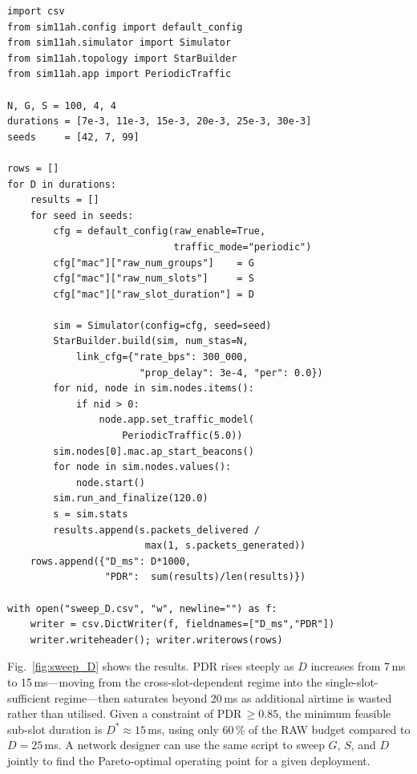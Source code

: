 \documentclass[conference]{IEEEtran}
\begin{document}
\begin{lstlisting}[style=python, caption={RAW sub-slot duration sweep.},
                   label={lst:sweep}]
import csv
from sim11ah.config import default_config
from sim11ah.simulator import Simulator
from sim11ah.topology import StarBuilder
from sim11ah.app import PeriodicTraffic

N, G, S = 100, 4, 4
durations = [7e-3, 11e-3, 15e-3, 20e-3, 25e-3, 30e-3]
seeds     = [42, 7, 99]

rows = []
for D in durations:
    results = []
    for seed in seeds:
        cfg = default_config(raw_enable=True,
                             traffic_mode="periodic")
        cfg["mac"]["raw_num_groups"]    = G
        cfg["mac"]["raw_num_slots"]     = S
        cfg["mac"]["raw_slot_duration"] = D

        sim = Simulator(config=cfg, seed=seed)
        StarBuilder.build(sim, num_stas=N,
            link_cfg={"rate_bps": 300_000,
                       "prop_delay": 3e-4, "per": 0.0})
        for nid, node in sim.nodes.items():
            if nid > 0:
                node.app.set_traffic_model(
                    PeriodicTraffic(5.0))
        sim.nodes[0].mac.ap_start_beacons()
        for node in sim.nodes.values():
            node.start()
        sim.run_and_finalize(120.0)
        s = sim.stats
        results.append(s.packets_delivered /
                        max(1, s.packets_generated))
    rows.append({"D_ms": D*1000,
                 "PDR":  sum(results)/len(results)})

with open("sweep_D.csv", "w", newline="") as f:
    writer = csv.DictWriter(f, fieldnames=["D_ms","PDR"])
    writer.writeheader(); writer.writerows(rows)
\end{lstlisting}

Fig.~\ref{fig:sweep_D} shows the results.
PDR rises steeply as $D$ increases from 7\,ms to 15\,ms---moving from the
cross-slot-dependent regime into the single-slot-sufficient regime---then
saturates beyond 20\,ms as additional airtime is wasted rather than
utilised.
Given a constraint of PDR\,$\geq\!0.85$, the minimum feasible sub-slot
duration is $D^* \approx 15$\,ms, using only 60\,\% of the RAW budget
compared to $D{=}25$\,ms.
A network designer can use the same script to sweep $G$, $S$, and $D$
jointly to find the Pareto-optimal operating point for a given deployment.
\end{document}
